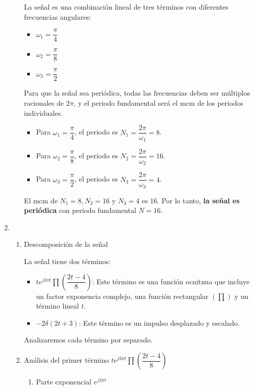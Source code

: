 \begin{enumerate}[label=\color{red}\textbf{\arabic*)}]
\begin{enumerate}[label=\color{red}\textbf{\alph*)}]
            La señal es una combinación lineal de tres términos con diferentes frecuencias angulares: 
            \begin{itemize}[label=\textbullet]
                \item $\omega_1=\dfrac{\pi}{4}$ 
                \item $\omega_2=\dfrac{\pi}{8}$ 
                \item $\omega_3=\dfrac{\pi}{2}$
            \end{itemize}
            Para que la señal sea periódica, todas las frecuencias deben ser múltiplos racionales de $2\pi$, y el periodo fundamental será el mcm de los periodos individuales.
            \begin{itemize}[label=\textbullet]
                \item Para $\omega_1=\dfrac{\pi}{4}$, el periodo es $N_1=\dfrac{2\pi}{\omega_1}=8$.
                \item Para $\omega_2=\dfrac{\pi}{8}$, el periodo es $N_2=\dfrac{2\pi}{\omega_2}=16$.
                \item Para $\omega_3=\dfrac{\pi}{2}$, el periodo es $N_3=\dfrac{2\pi}{\omega_3}=4$.
            \end{itemize}
            El mcm de $N_1=8,N_2=16$ y $N_3=4$ es $16$. Por lo tanto,  \textbf{la señal es periódica} con periodo fundamental $N=16$. 
    \end{enumerate}
\item {}

\begin{enumerate}[label=Paso \arabic*:]
    \item Descomposición de la señal

        La señal tiene dos términos:
        \begin{itemize}[label=\textbullet]
            \item $te^{j 3\pi t}\prod\left( \dfrac{2t-4}{8} \right)  $: Este término es una función ocnitnua que incluye un factor exponencia complejo, una función rectangular $\left( \prod \right) $ y un término lineal $t$.
            \item $-2\delta(2t+3)$: Este término es un impulso desplazado y escalado.
        \end{itemize}
        Analizaremos cada término por separado.
    \item Análisis del primer término $te^{j 3\pi t}\prod\left( \dfrac{2t-4}{8} \right)  $ 
        \begin{enumerate}[label=\alph*)]
            \item Parte exponencial $e^{j 3\pi t} $ 


\end{enumerate}
\end{enumerate}
\end{enumerate}
